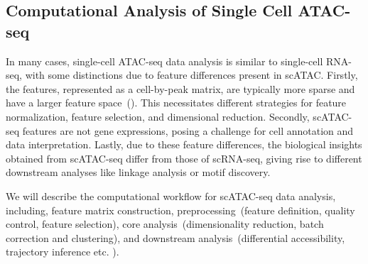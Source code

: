 \subsection{Computational Analysis of Single Cell ATAC-seq}
\label{background:sec2:scATAC}
In many cases, single-cell ATAC-seq data analysis is similar to single-cell RNA-seq, with some distinctions due to feature differences present in scATAC. Firstly, the features, represented as a cell-by-peak matrix, are typically more sparse and have a larger feature space~(). This necessitates different strategies for feature normalization, feature selection, and dimensional reduction. Secondly, scATAC-seq features are not gene expressions, posing a challenge for cell annotation and data interpretation. Lastly, due to these feature differences, the biological insights obtained from scATAC-seq differ from those of scRNA-seq, giving rise to different downstream analyses like linkage analysis or motif discovery.

We will describe the computational workflow for scATAC-seq data analysis, including, feature matrix construction, preprocessing~(feature definition, quality control, feature selection), core analysis~(dimensionality reduction, batch correction and clustering), and downstream analysis~(differential accessibility, trajectory inference etc. ).

